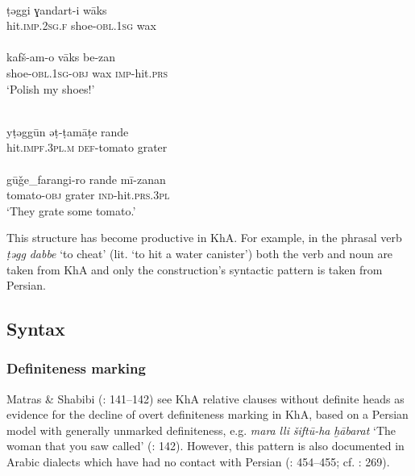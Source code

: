 \documentclass[output=paper,nonflat]{langsci/langscibook}
\begin{document}
\ea \label{taggi}
\\
\gll ṭəggi ɣandart-i wāks\\
     hit.\textsc{imp.2sg.f} shoe-\textsc{obl}.1\textsc{sg} wax\\
 
\\
\gll kafš-am-o vāks be-zan\\
     shoe-\textsc{obl.}1\textsc{sg-obj} wax \textsc{imp-}hit\textsc{.prs}\\
\glt ‘Polish my shoes!’
\z\z

\ea \label{tamate}
\\
\gll yṭəggūn əṭ-ṭamāṭe rande\\
     hit.\textsc{impf.3pl.m} \textsc{def}{}-tomato grater \\
 
\\
\gll gūǧe\_farangi-ro rande mī-zanan\\
     tomato-\textsc{obj} grater \textsc{ind}-hit\textsc{.prs.3pl} \\
\glt ‘They grate some tomato.’
\z\z

This structure has become productive in KhA. For example, in the phrasal verb \textit{ṭəgg} \textit{dabbe} ‘to cheat’ (lit. ‘to hit a water canister’) both the verb and noun are taken from KhA and only the construction’s syntactic pattern is taken from Persian. 

\subsection{Syntax}
\subsubsection{Definiteness marking}

Matras \& Shabibi (\citeyear{MatrasShabibi2007}: 141–142) see KhA relative clauses without definite heads as evidence for the decline of overt definiteness marking in KhA, based on a Persian model with generally unmarked definiteness, e.g. \textit{mara} \textit{lli} \textit{šiftū-ha} \textit{ḫābarat} ‘The woman that you saw called’ (\citeyear{MatrasShabibi2007}: 142). However, this pattern is also documented in Arabic dialects which have had no contact with Persian (\citealt{Pat-El2017}: 454–455; cf. \citealt{Procházka2018Fertile}: 269).
\end{document}
